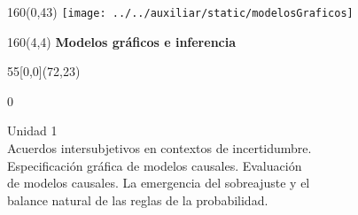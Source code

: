 \documentclass[shownotes,aspectratio=169]{beamer}
\begin{document}
\begin{frame}
\begin{textblock}{160}(0,43)
\texttt{[image: ../../auxiliar/static/modelosGraficos]}
\end{textblock}


\begin{textblock}{160}(4,4)
\LARGE \textcolor{black!85}{\fontsize{22}{0}\selectfont \textbf{Modelos gráficos e inferencia}}
\end{textblock}


\begin{textblock}{55}[0,0](72,23)
\begin{turn}{0}
\parbox{10cm}{\sloppy\setlength\parfillskip{0pt}
\textcolor{black!85}{Unidad 1} \\
\small\textcolor{black!85}{Acuerdos intersubjetivos en contextos de incertidumbre.} \\
\small\textcolor{black!85}{Especificación gráfica de modelos causales. Evaluación} \\
\small\textcolor{black!85}{de modelos causales. La emergencia del sobreajuste y el} \\
\small\textcolor{black!85}{balance natural de las reglas de la probabilidad.} \\
}
\end{turn}
\end{textblock}

\end{frame}
\end{document}
